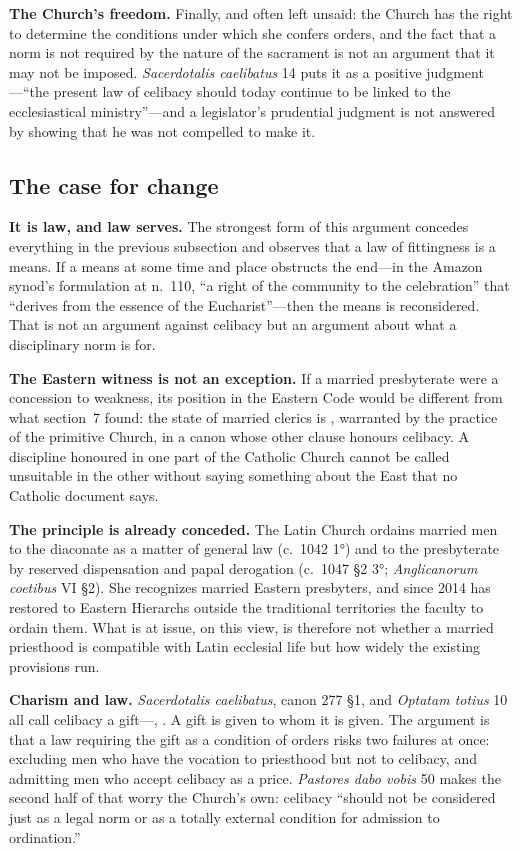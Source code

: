 \textbf{The Church's freedom.} Finally, and often left unsaid: the Church has the right to determine the conditions under which she confers orders, and the fact that a norm is not required by the nature of the sacrament is not an argument that it may not be imposed. \emph{Sacerdotalis caelibatus} 14 puts it as a positive judgment---``the present law of celibacy should today continue to be linked to the ecclesiastical ministry''---and a legislator's prudential judgment is not answered by showing that he was not compelled to make it.

\subsection{The case for change}

\textbf{It is law, and law serves.} The strongest form of this argument concedes everything in the previous subsection and observes that a law of fittingness is a means. If a means at some time and place obstructs the end---in the Amazon synod's formulation at n.~110, ``a right of the community to the celebration'' that ``derives from the essence of the Eucharist''---then the means is reconsidered. That is not an argument against celibacy but an argument about what a disciplinary norm is for.

\textbf{The Eastern witness is not an exception.} If a married presbyterate were a concession to weakness, its position in the Eastern Code would be different from what section~7 found: the state of married clerics is , warranted by the practice of the primitive Church, in a canon whose other clause honours celibacy. A discipline honoured in one part of the Catholic Church cannot be called unsuitable in the other without saying something about the East that no Catholic document says.

\textbf{The principle is already conceded.} The Latin Church ordains married men to the diaconate as a matter of general law (c.~1042 1°) and to the presbyterate by reserved dispensation and papal derogation (c.~1047 §2 3°; \emph{Anglicanorum coetibus} VI §2). She recognizes married Eastern presbyters, and since 2014 has restored to Eastern Hierarchs outside the traditional territories the faculty to ordain them. What is at issue, on this view, is therefore not whether a married priesthood is compatible with Latin ecclesial life but how widely the existing provisions run.

\textbf{Charism and law.} \emph{Sacerdotalis caelibatus}, canon 277 §1, and \emph{Optatam totius} 10 all call celibacy a gift---, . A gift is given to whom it is given. The argument is that a law requiring the gift as a condition of orders risks two failures at once: excluding men who have the vocation to priesthood but not to celibacy, and admitting men who accept celibacy as a price. \emph{Pastores dabo vobis} 50 makes the second half of that worry the Church's own: celibacy ``should not be considered just as a legal norm or as a totally external condition for admission to ordination.''

